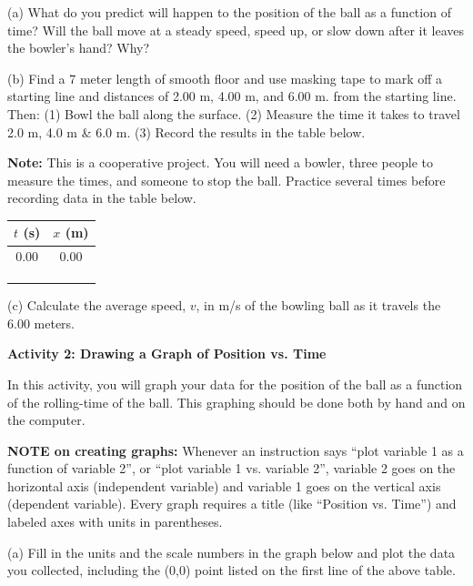 (a) What do you predict will happen to the position of the ball as a function
of time? Will the ball move at a steady speed, speed up, or slow down after
it leaves the bowler's hand? Why?
\vspace{20mm}

(b) Find a 7 meter length of smooth floor and use masking tape to mark off a
starting line and distances of 2.00 m, 4.00 m, and 6.00 m. from the starting
line. Then: (1) Bowl the ball along the surface. (2) Measure the time it takes
to travel 2.0 m, 4.0 m \& 6.0 m. (3) Record the results in the table below.

\textbf{Note:} This is a cooperative project. You will need a bowler, three
people to measure the times, and someone to stop the ball. Practice several
times before recording data in the table below.

\vspace{0.3cm}
{\centering \begin{tabular}{|c|c|}
\hline 
$t$ (s)&
$x$ (m)\\
\hline 
\hline 
0.00&
0.00\\
\hline 
&
\\
\hline 
&
\\
\hline 
&
\\
\hline 
\end{tabular}\par}
\vspace{0.3cm}

(c) Calculate the average speed, $v$, in m/s of the bowling ball as it travels
the 6.00 meters.
\vspace{20mm}

\textbf{Activity 2: Drawing a Graph of Position vs. Time}

In this activity, you will graph your data for the position of the ball as
a function of the rolling-time of the ball. This graphing should be done both
by hand and on the computer.

\textbf{NOTE on creating graphs:} Whenever an instruction says ``plot variable 1 as a function of variable 2'', or ``plot variable 1 vs. variable 2'', variable 2 goes on the horizontal axis (independent variable) and variable 1 goes on the vertical axis (dependent variable). Every graph requires a title (like ``Position vs. Time'') and labeled axes with units in parentheses.

(a) Fill in the units and the scale numbers in the graph below and plot the
data you collected, including the (0,0) point listed on the first line of the
above table.

